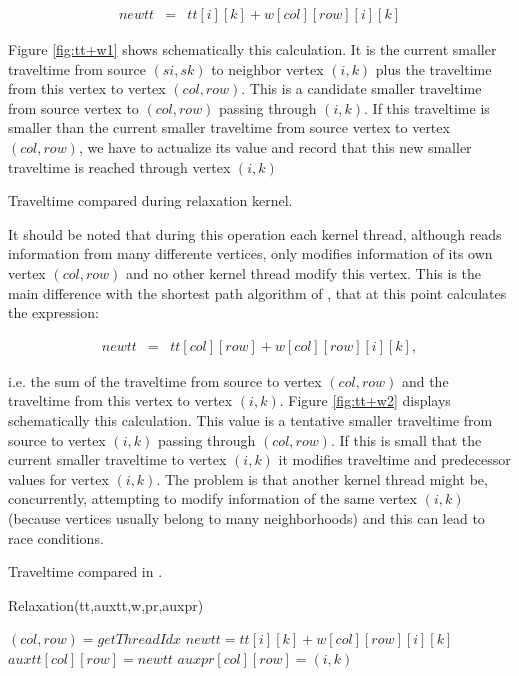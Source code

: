 \begin{eqnarray}
 newtt &=& tt[i][k] + w[col][row][i][k]
\end{eqnarray}

Figure \ref{fig:tt+w1} shows schematically this calculation.
It is the current smaller traveltime from source $(si,sk)$ to 
neighbor vertex $(i,k)$ plus the traveltime from this vertex 
to vertex $(col,row)$. This is a candidate smaller traveltime
from source vertex to $(col,row)$ passing through $(i,k)$.
If this traveltime is smaller than the current smaller 
traveltime from source vertex to vertex $(col,row)$, we have
to actualize its value and record that this new smaller
traveltime is reached through vertex $(i,k)$

{Traveltime compared during relaxation kernel.}

It should be noted that during this operation each
kernel thread, although reads information from many
differente vertices, only modifies information of its 
own vertex $(col,row)$ and no other kernel thread modify
this vertex. This is the main difference with 
the shortest path algorithm of 
\cite{Harish:2007:ALG:1782174.1782200}, that at this 
point calculates the expression:

\begin{eqnarray}
 newtt &=& tt[col][row] + w[col][row][i][k],
\end{eqnarray}

i.e. the sum of the traveltime from source to vertex $(col,row)$
and the traveltime from this vertex to vertex $(i,k)$. Figure 
\ref{fig:tt+w2} displays schematically this calculation. This 
value is a tentative smaller traveltime from source to vertex
$(i,k)$ passing through $(col,row)$. If this is small that
the current smaller traveltime to vertex $(i,k)$ it modifies 
traveltime and predecessor values for vertex $(i,k)$. The 
problem is that another kernel thread might be, concurrently,  
attempting to modify information of the same vertex $(i,k)$ 
(because vertices usually belong to many neighborhoods)
and this can lead to race conditions.

{Traveltime compared in \cite{Harish:2007:ALG:1782174.1782200}.}

\begin{algorithm}
 \caption{Relaxation(tt,auxtt,w,pr,auxpr)}
 \label{alg:kernel1}
 \begin{algorithmic}[1]
  \STATE $(col,row) = getThreadIdx$  
    \STATE $newtt = tt[i][k] + w[col][row][i][k]$
      \STATE $auxtt[col][row] = newtt$
      \STATE $auxpr[col][row] = (i,k)$
    \ENDIF
  \ENDFOR  
 \end{algorithmic}
\end{algorithm}


